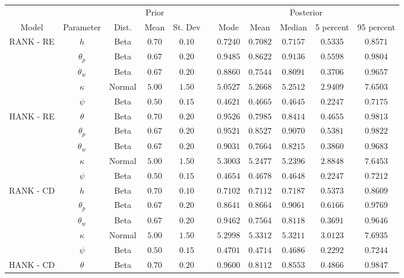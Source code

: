 \begin{table} 
\centering 
\begin{tabular}{|cc|ccc|c|ccccc|} \hline 
& & \multicolumn{3}{|c|}{Prior} & & \multicolumn{5}{|c|}{Posterior} \\ 
Model & Parameter & Dist. & Mean & St. Dev & & Mode & Mean & Median &  5 percent & 95 percent \\ \hline 
RANK - RE & $h$ & Beta & $0.70$ & $0.10$ & & $ 0.7240$ & $ 0.7082$ & $ 0.7157$& $ 0.5335$ & $ 0.8571$ \\ 
 & $\theta_p$ & Beta & $0.67$ & $0.20$ & & $ 0.9485$ & $ 0.8622$ & $ 0.9136$& $ 0.5598$ & $ 0.9804$ \\ 
 & $\theta_w$ & Beta & $0.67$ & $0.20$ & & $ 0.8860$ & $ 0.7544$ & $ 0.8091$& $ 0.3706$ & $ 0.9657$ \\ 
 & $\kappa$ & Normal & $5.00$ & $1.50$ & & $ 5.0527$ & $ 5.2668$ & $ 5.2512$& $ 2.9409$ & $ 7.6503$ \\ 
 & $\psi$ & Beta & $0.50$ & $0.15$ & & $ 0.4621$ & $ 0.4665$ & $ 0.4645$& $ 0.2247$ & $ 0.7175$ \\ \hline 
 HANK - RE & $\theta$ & Beta & $0.70$ & $0.20$ & & $ 0.9526$ & $ 0.7985$ & $ 0.8414$& $ 0.4655$& $ 0.9813$ \\ 
 & $\theta_p$ & Beta & $0.67$ & $0.20$ & & $ 0.9521$ & $ 0.8527$ & $ 0.9070$& $ 0.5381$ & $ 0.9822$ \\ 
 & $\theta_w$ & Beta & $0.67$ & $0.20$ & & $ 0.9031$ & $ 0.7664$ & $ 0.8215$& $ 0.3860$ & $ 0.9683$ \\ 
 & $\kappa$ & Normal & $5.00$ & $1.50$ & & $ 5.3003$ & $ 5.2477$ & $ 5.2396$& $ 2.8848$ & $ 7.6453$ \\ 
 & $\psi$ & Beta & $0.50$ & $0.15$ & & $ 0.4654$ & $ 0.4678$ & $ 0.4648$& $ 0.2247$ & $ 0.7212$ \\ \hline 
 RANK - CD & $h$ & Beta & $0.70$ & $0.10$ & & $ 0.7102$ & $ 0.7112$ & $ 0.7187$& $ 0.5373$ & $ 0.8609$ \\ 
 & $\theta_p$ & Beta & $0.67$ & $0.20$ & & $ 0.8641$ & $ 0.8664$ & $ 0.9061$& $ 0.6166$ & $ 0.9769$ \\ 
 & $\theta_w$ & Beta & $0.67$ & $0.20$ & & $ 0.9462$ & $ 0.7564$ & $ 0.8118$& $ 0.3691$ & $ 0.9646$ \\ 
 & $\kappa$ & Normal & $5.00$ & $1.50$ & & $ 5.2998$ & $ 5.3312$ & $ 5.3211$& $ 3.0123$ & $ 7.6935$ \\ 
 & $\psi$ & Beta & $0.50$ & $0.15$ & & $ 0.4701$ & $ 0.4714$ & $ 0.4686$& $ 0.2292$ & $ 0.7244$ \\ \hline 
 HANK - CD & $\theta$ & Beta & $0.70$ & $0.20$ & & $ 0.9600$ & $ 0.8112$ & $ 0.8553$& $ 0.4866$& $ 0.9847$ \\ 

\end{tabular}
\end{table}
